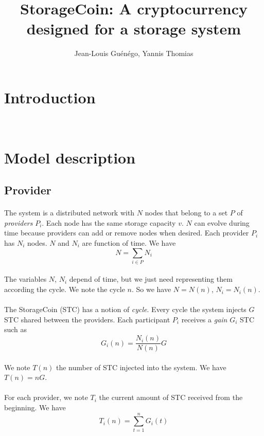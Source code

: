 \documentclass[a4paper,12pt]{article}
\title{StorageCoin: A cryptocurrency designed for a storage system}
\author{Jean-Louis Gu\'{e}n\'{e}go, Yannis Thomias}
\date{}
\begin{document}
\maketitle
\tableofcontents

\section{Introduction}
~\cite{bitcoin}
~\cite{peercoin}
~\cite{smallcell}

\section{Model description}
\subsection{Provider}

\paragraph*{}
The system is a distributed network with $N$ nodes that belong to a set $P$ of \emph{providers} $P_{i}$.
Each node has the same storage capacity $v$.
$N$ can evolve during time because providers can add or remove nodes  when desired. Each provider $P_{i}$ has $N_{i}$ nodes.
$N$ and $N_{i}$ are function of time. We have 
\[N=\sum\limits_{i\in{P}}N_{i}\]

\paragraph*{}
The variables $N$, $N_{i}$ depend of time, but we just need representing them according the cycle. We note the cycle $n$.
So we have $N=N(n)$, $N_{i}=N_{i}(n)$. 

\paragraph*{}
The StorageCoin (STC) has a notion of \emph{cycle}.
Every cycle the system injects $G$ STC shared between the providers.
Each participant $P_{i}$ receives a \emph{gain} $G_{i}$ STC such as
\[G_{i}(n)=\frac{N_{i}(n)}{N(n)}G\]

\paragraph*{}
We note $T(n)$ the number of STC injected into the system. We have $T(n)=nG$.

\paragraph*{}
For each provider, we note $T_{i}$ the current amount of STC received from the beginning. We have
\[T_{i}(n)=\sum\limits_{t=1}^n G_{i}(t)\]
\end{document}
